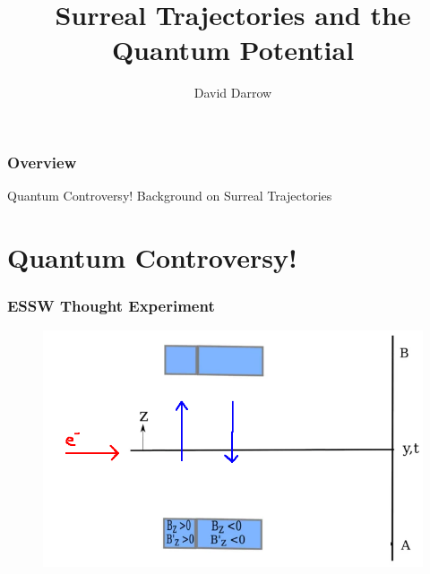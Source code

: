 \documentclass[compress,10pt,usenames,dvipsnames]{beamer}
\title{Surreal Trajectories and the Quantum Potential}
\author{David Darrow}
\institute{MIT}
\theoremstyle{remark}
\begin{document}
\frame{\titlepage}

\begin{frame}\frametitle{Overview}
	
	\begin{block}{}
		\alert{Quantum Controversy! Background on Surreal Trajectories}
	\end{block}
\end{frame}

\section{Quantum Controversy!}
\begin{frame}\frametitle{ESSW Thought Experiment}
	\begin{figure}
		\centering
		\includegraphics[scale=0.3]{Figures/diag0.png}
	\end{figure}
\end{frame}
\end{document}
